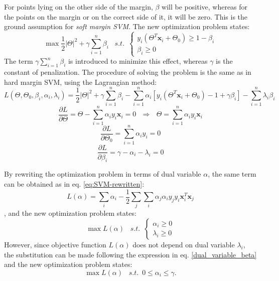 For points lying on the other side of the margin, $\beta$ will be positive, whereas for the points on the margin or on the correct side of it, it will be zero. This is the ground assumption for \emph{soft margin SVM}. The new optimization problem states:
 \begin{equation} 
\max \frac{1}{2} \vert \Theta \vert ^2 + \gamma \sum_{i=1}^n \beta_i \,\,\,\,\, s.t. \,\,\, \left\{\begin{array}{lr} y_i \left(\Theta^T \mathbf{x}_i + \Theta_0\right) \geq 1 - \beta_i \\
\beta_i \geq 0  \end{array}\right.
\end{equation}
The term $\gamma \sum_{i=1}^n \beta_i$ is introduced to minimize this effect, whereas $\gamma$ is the constant of penalization. The procedure of solving the problem is the same as in hard margin SVM, using the Lagrangian method:
\begin{equation} 
L(\Theta, \Theta_0, \beta_i, \alpha_i, \lambda_i) = \frac{1}{2} \vert \Theta \vert ^2 + \gamma \sum_{i=1}^n \beta_i - \sum_{i=1}^n \alpha_i \left[y_i \left(\Theta^T \mathbf{x}_i + \Theta_0\right) - 1 + \gamma \beta_i \right] - \sum_{i=1}^n \lambda_i \beta_i
\end{equation}
\begin{equation}
\frac{\partial L}{\partial \Theta} = \Theta - \sum_{i=1}^n \alpha_i y_i \mathbf{x}_i = 0 \,\,\,\, \Rightarrow \,\,\,\, \Theta = \sum_{i=1}^n \alpha_i y_i \mathbf{x}_i
\end{equation}
\begin{equation}
\frac{\partial L}{\partial \Theta_0} = \sum_{i=1}^n \alpha_i y_i = 0
\end{equation}
\begin{equation} \label{dual_variable_beta}
\frac{\partial L}{\partial \beta_i} = \gamma - \alpha_i - \lambda_i = 0
\end{equation}

By rewriting the optimization problem in terms of dual variable $\alpha$, the same term can be obtained as in eq. \ref{eq:SVM-rewritten}:
\begin{equation} 
L(\alpha) = \sum_i \alpha_i - \frac{1}{2} \sum_j \sum_i \alpha_j \alpha_i y_j y_i \mathbf{x}_i^T \mathbf{x}_j
\end{equation}
, and the new optimization problem states:
\begin{equation} 
\max L(\alpha) \,\,\,\,\, s.t. \,\,\, \left\{\begin{array}{lr} \alpha_i \geq 0 \\
\lambda_i \geq 0  \end{array}\right.
\end{equation}
However, since objective function $L(\alpha)$ does not depend on dual variable $\lambda_i$, the substitution can be made following the expression in eq. \ref{dual_variable_beta} and the new optimization problem states:
 \begin{equation} 
\max L(\alpha) \,\,\,\,\, s.t. \,\,\, 0 \leq \alpha_i \leq \gamma.
\end{equation}

